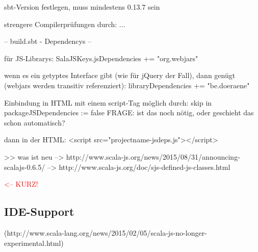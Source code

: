 \documentclass[a4paper, 12pt, hidelinks, listof=totoc, listoftables=totoc, bibliography=totoc]{scrreprt}
\newcommand{\TODO}[1]{\textcolor{red}{#1}\newline}
\begin{document}

sbt-Version festlegen, muss mindestens 0.13.7 sein


strengere Compilerprüfungen durch: ...


-- build.sbt - Dependencys --

für JS-Librarys:
SalaJSKeys.jsDependencies += "org.webjars" %

wenn es ein getyptes Interface gibt (wie für jQuery der Fall), dann genügt (webjars werden transitiv referenziert):
libraryDependencies += "be.doeraene" %

Einbindung in \ac{HTML} mit einem script-Tag möglich durch:
skip in packageJSDependencies := false
FRAGE: ist das noch nötig, oder geschieht das schon automatisch?

dann in der \ac{HTML}:
<script src="projectname-jsdeps.js"></script>











































>> was ist neu
  -->  http://www.scala-js.org/news/2015/08/31/announcing-scalajs-0.6.5/
  -->  http://www.scala-js.org/doc/sjs-defined-js-classes.html

\TODO{<--  KURZ!}







\subsection{IDE-Support}
(http://www.scala-lang.org/news/2015/02/05/scala-js-no-longer-experimental.html)
\end{document}
